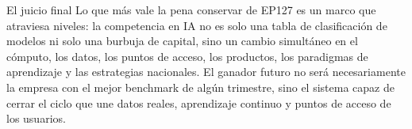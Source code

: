 \begin{importantbox}{El juicio final}
Lo que más vale la pena conservar de EP127 es un marco que atraviesa niveles: la competencia en IA no es solo una tabla de clasificación de modelos ni solo una burbuja de capital, sino un cambio simultáneo en el cómputo, los datos, los puntos de acceso, los productos, los paradigmas de aprendizaje y las estrategias nacionales. El ganador futuro no será necesariamente la empresa con el mejor benchmark de algún trimestre, sino el sistema capaz de cerrar el ciclo que une datos reales, aprendizaje continuo y puntos de acceso de los usuarios.
\end{importantbox}


